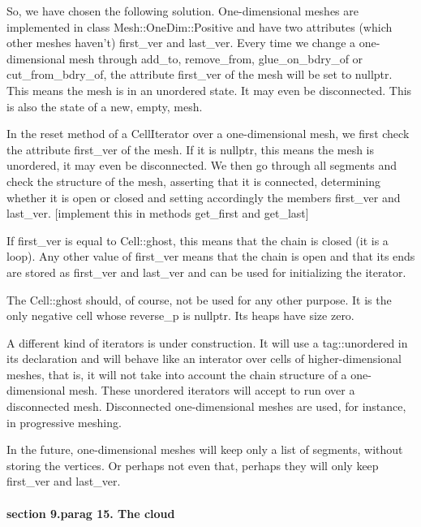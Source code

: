 {So, we have chosen the following solution.
One-dimensional meshes are implemented in class {\codett Mesh::OneDim::Positive} and have
two attributes (which other meshes haven't) {\codett first\_ver} and {\codett last\_ver}.
Every time we change a one-dimensional mesh through {\codett add\_to},
{\codett remove\_from}, {\codett glue\_on\_bdry\_of} or {\codett cut\_from\_bdry\_of},
the attribute {\codett first\_ver} of the mesh will be set to {\codett nullptr}.
This means the mesh is in an unordered state.
It may even be disconnected.
This is also the state of a new, empty, mesh.

In the {\codett reset} method of a {\codett CellIterator} over a one-dimensional mesh,
we first check the attribute {\codett first\_ver} of the mesh.
If it is {\codett nullptr}, this means the mesh is unordered, it may even be disconnected.
We then go through all segments and check the structure of the mesh, 
{\codett assert}ing that it is connected, determining whether it is open or closed
and setting accordingly the members {\codett first\_ver} and {\codett last\_ver}.
[implement this in methods {\codett get\_first} and {\codett get\_last}]

If {\codett first\_ver} is equal to {\codett Cell::ghost}, this means that the chain
is closed (it is a loop).
Any other value of {\codett first\_ver} means that the chain is open and that its
ends are stored as {\codett first\_ver} and {\codett last\_ver} and can be used for
initializing the iterator.

The {\codett Cell::ghost} should, of course, not be used for any other purpose.
It is the only negative cell whose {\codett reverse\_p} is {\codett nullptr}.
Its {\codett heap}s have size zero.

A different kind of iterators is under construction.
It will use a {\codett tag::unordered} in its declaration and will behave like an interator
over cells of higher-dimensional meshes, that is, it will not take into account the chain
structure of a one-dimensional mesh.
These {\codett unordered} iterators will accept to run over a disconnected mesh.
Disconnected one-dimensional meshes are used, for instance, in progressive meshing.

In the future, one-dimensional meshes will keep only a list of segments,
without storing the vertices.
Or perhaps not even that, perhaps they will only keep {\codett first\_ver} and
{\codett last\_ver}.


\paragraph{\numb section 9.\numb parag 15. The cloud}

}

